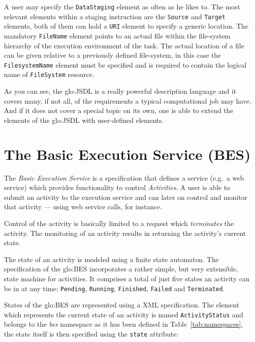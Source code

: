 A user may  specify the \texttt{DataStaging} element as  often as he likes
to.   The most  relevant elements  within  a staging  instruction are  the
\texttt{Source}  and \texttt{Target}  elements, both  of them  can  hold a
\texttt{URI}  element  to  specify  a  generic  location.   The  mandatory
\texttt{FileName} element points to  an actual file within the file-system
hierarchy of the execution environment of the task. The actual location of
a file can be given relative  to a previously defined file-system, in this
case the \texttt{FilesystemName} element must be specified and is required
to contain the logical name of \texttt{FileSystem} resource.

\bigskip

As  you can  see,  the  \gls{glo:JSDL} is  a  really powerful  description
language and  it covers many,  if not all,  of the requirements  a typical
computational job  may have. And if it  does not cover a  special topic on
its own,  one is able  to extend the  elements of the  \gls{glo:JSDL} with
user-defined elements.

\section[Basic Execution Service]{The Basic Execution Service (BES)}
\label{sec:fundamentals:bes}

The \emph{Basic Execution Service} \cite{ogsa-bes} is a specification that
defines  a service (e.g.~a  web service)  which provides  functionality to
control \emph{Activities}.   A user is able  to submit an  activity to the
execution service and  can later on control and  monitor that activity ---
using web service calls, for instance.

Control  of  the  activity  is   basically  limited  to  a  request  which
\emph{terminates} the  activity. The monitoring of an  activity results in
returning the activity's current state.

The state  of an activity is  modeled using a finite  state automaton. The
specification of the \gls{glo:BES}  incorporates a rather simple, but very
extensible, state  machine for  activities. It comprises  a total  of just
five  states  an  activity  can  be  in  at  any  time:  \texttt{Pending},
\texttt{Running},       \texttt{Finished},       \texttt{Failed}       and
\texttt{Terminated}.

States of the \gls{glo:BES} are represented using a XML specification. The
element  which  represents the  current  state  of  an activity  is  named
\texttt{ActivityStatus} and belongs to  the \emph{bes} namespace as it has
been  defined  in Table~\ref{tab:namespaces},  the  state  itself is  then
specified using the \texttt{state} attribute:

